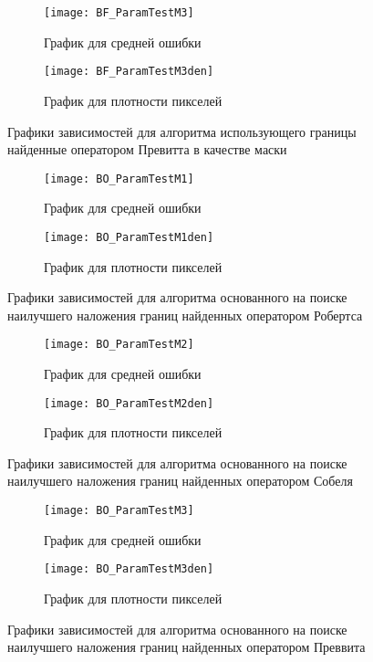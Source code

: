 \begin{figure}[h]
	\centering
	\begin{subfigure}{0.45\textwidth}  
		\centering
		\texttt{[image: BF\_ParamTestM3]}
		\caption*{График для средней ошибки}
	\end{subfigure}    
	\begin{subfigure}{0.45\textwidth}  
		\centering
		\texttt{[image: BF\_ParamTestM3den]}        
		\caption*{График для плотности пикселей}
	\end{subfigure}
	\caption{Графики зависимостей для алгоритма использующего границы найденные оператором Превитта в качестве маски}
	\label{fig:PT_BF_M3}
\end{figure}


\begin{figure}[h]
	\centering
	\begin{subfigure}{0.45\textwidth}  
		\centering
		\texttt{[image: BO\_ParamTestM1]}
		\caption*{График для средней ошибки}
	\end{subfigure}    
	\begin{subfigure}{0.45\textwidth}  
		\centering
		\texttt{[image: BO\_ParamTestM1den]}        
		\caption*{График для плотности пикселей}
	\end{subfigure}
	\caption{Графики зависимостей для алгоритма основанного на поиске наилучшего наложения границ найденных оператором Робертса}
	\label{fig:PT_BO_M1}
\end{figure}
\begin{figure}[h]
\centering
\begin{subfigure}{0.45\textwidth}  
	\centering
	\texttt{[image: BO\_ParamTestM2]}
	\caption*{График для средней ошибки}
\end{subfigure}    
\begin{subfigure}{0.45\textwidth}  
	\centering
	\texttt{[image: BO\_ParamTestM2den]}        
	\caption*{График для плотности пикселей}
\end{subfigure}
\caption{Графики зависимостей для алгоритма основанного на поиске наилучшего наложения границ найденных оператором Собеля}
\label{fig:PT_BO_M2}
\end{figure}
\begin{figure}[h]
\centering
\begin{subfigure}{0.45\textwidth}  
	\centering
	\texttt{[image: BO\_ParamTestM3]}
	\caption*{График для средней ошибки}
\end{subfigure}    
\begin{subfigure}{0.45\textwidth}  
	\centering
	\texttt{[image: BO\_ParamTestM3den]}        
	\caption*{График для плотности пикселей}
\end{subfigure}
\caption{Графики зависимостей для алгоритма основанного на поиске наилучшего наложения границ найденных оператором Преввита}
\label{fig:PT_BO_M3}
\end{figure}


